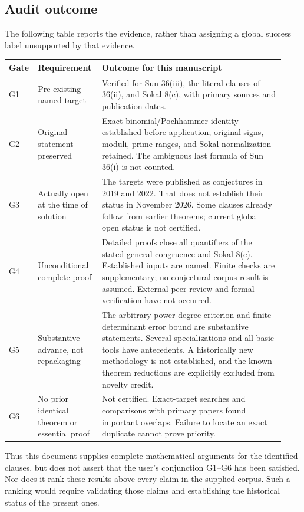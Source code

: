 \documentclass[11pt,a4paper]{article}
\theoremstyle{remark}
\begin{document}
\subsection{Audit outcome}
The following table reports the evidence, rather than assigning a
global success label unsupported by that evidence.

\small
\begin{longtable}{@{}>{\raggedright\arraybackslash}p{0.07\linewidth}>{\raggedright\arraybackslash}p{0.22\linewidth}>{\raggedright\arraybackslash}p{0.64\linewidth}@{}}
\toprule
Gate & Requirement & Outcome for this manuscript\\
\midrule
\endhead
G1 & Pre-existing named target & Verified for Sun 36(iii), the literal clauses of 36(ii), and Sokal 8(c), with primary sources and publication dates.\\[4pt]
G2 & Original statement preserved & Exact binomial/Pochhammer identity established before application; original signs, moduli, prime ranges, and Sokal normalization retained. The ambiguous last formula of Sun 36(i) is not counted.\\[4pt]
G3 & Actually open at the time of solution & The targets were published as conjectures in 2019 and 2022. That does not establish their status in November 2026. Some clauses already follow from earlier theorems; current global open status is not certified.\\[4pt]
G4 & Unconditional complete proof & Detailed proofs close all quantifiers of the stated general congruence and Sokal 8(c). Established inputs are named. Finite checks are supplementary; no conjectural corpus result is assumed. External peer review and formal verification have not occurred.\\[4pt]
G5 & Substantive advance, not repackaging & The arbitrary-power degree criterion and finite determinant error bound are substantive statements. Several specializations and all basic tools have antecedents. A historically new methodology is not established, and the known-theorem reductions are explicitly excluded from novelty credit.\\[4pt]
G6 & No prior identical theorem or essential proof & Not certified. Exact-target searches and comparisons with primary papers found important overlaps. Failure to locate an exact duplicate cannot prove priority.\\
\bottomrule
\end{longtable}
\normalsize

Thus this document supplies complete mathematical arguments for the
identified clauses, but does not assert that the user's conjunction
G1--G6 has been satisfied. Nor does it rank these results above every
claim in the supplied corpus. Such a ranking would require validating
those claims and establishing the historical status of the present
ones.
\end{document}
